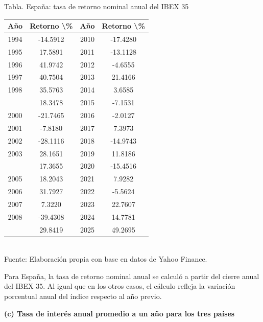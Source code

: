 \documentclass{article}\usepackage[]{graphicx}\usepackage[]{xcolor}
\begin{document}
\begin{center}
Tabla. España: tasa de retorno nominal anual del IBEX 35
\end{center}
\begin{center}

\begin{tabular}{cccc}
\toprule
Año & Retorno \textbackslash{}\% & Año & Retorno \textbackslash{}\%\\
\midrule
1994 & -14.5912 & 2010 & -17.4280\\
1995 & 17.5891 & 2011 & -13.1128\\
1996 & 41.9742 & 2012 & -4.6555\\
1997 & 40.7504 & 2013 & 21.4166\\
1998 & 35.5763 & 2014 & 3.6585\\
\addlinespace
1999 & 18.3478 & 2015 & -7.1531\\
2000 & -21.7465 & 2016 & -2.0127\\
2001 & -7.8180 & 2017 & 7.3973\\
2002 & -28.1116 & 2018 & -14.9743\\
2003 & 28.1651 & 2019 & 11.8186\\
\addlinespace
2004 & 17.3655 & 2020 & -15.4516\\
2005 & 18.2043 & 2021 & 7.9282\\
2006 & 31.7927 & 2022 & -5.5624\\
2007 & 7.3220 & 2023 & 22.7607\\
2008 & -39.4308 & 2024 & 14.7781\\
\addlinespace
2009 & 29.8419 & 2025 & 49.2695\\
\bottomrule
\end{tabular}
\\[0.3em]
{\footnotesize Fuente: Elaboración propia con base en datos de Yahoo Finance.}
\end{center}


Para España, la tasa de retorno nominal anual se calculó a partir del cierre anual del IBEX 35. Al igual que en los otros casos, el cálculo refleja la variación porcentual anual del índice respecto al año previo.

\newpage
\textbf{(c) Tasa de interés anual promedio a un año para los tres países}
\end{document}
